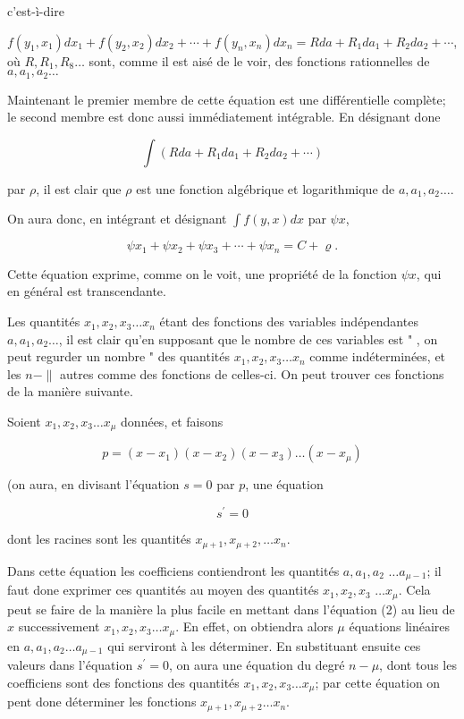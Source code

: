 \documentclass{article}
\begin{document}
c'est-ì-dire

\(f\left(y_{1}, x_{1}\right) d x_{1}+f\left(y_{2}, x_{2}\right) d x_{2}+\cdots+f\left(y_{n}, x_{n}\right) d x_{n}=R d a+R_{1} d a_{1}+R_{2} d a_{2}+\cdots\), où \(R, R_{1}, R_{8} \ldots\) sont, comme il est aisé de le voir, des fonctions rationnelles de \(a, a_{1}, a_{2} \ldots\)

Maintenant le premier membre de cette équation est une différentielle complète; le second membre est donc aussi immédiatement intégrable. En désignant done

\[
\int\left(R d a+R_{1} d a_{1}+R_{2} d a_{2}+\cdots\right)
\]

par \(\rho\), il est clair que \(\rho\) est une fonction algébrique et logarithmique de \(a, a_{1}, a_{2} \ldots\).

On aura donc, en intégrant et désignant \(\int f(y, x) d x\) par \(\psi x\),

\[
\psi x_{1}+\psi x_{2}+\psi x_{3}+\cdots+\psi x_{n}=C+\varrho .
\]

Cette équation exprime, comme on le voit, une propriété de la fonction \(\psi x\), qui en général est transcendante.

Les quantités \(x_{1}, x_{2}, x_{3} \ldots x_{n}\) étant des fonctions des variables indépendantes \(a, a_{1}, a_{2} \ldots\), il est clair qu'en supposant que le nombre de ces variables est " , on peut regurder un nombre " des quantités \(x_{1}, x_{2}, x_{3} \ldots x_{n}\) comme indéterminées, et les \(n-\|\) autres comme des fonctions de celles-ci. On peut trouver ces fonctions de la manière suivante.

Soient \(x_{1}, x_{2}, x_{3} \ldots x_{\mu}\) données, et faisons

\[
p=\left(x-x_{1}\right)\left(x-x_{2}\right)\left(x-x_{3}\right) \ldots\left(x-x_{\mu}\right)
\]

(on aura, en divisant l'équation \(s=0\) par \(p\), une équation

\[
s^{\prime}=0
\]

dont les racines sont les quantités \(x_{\mu+1}, x_{\mu+2}, \ldots x_{n}\).

Dans cette équation les coefficiens contiendront les quantités \(a, a_{1}, a_{2}\) \(\ldots a_{\mu-1}\); il faut done exprimer ces quantités au moyen des quantités \(x_{1}, x_{2}, x_{3}\) \(\ldots x_{\mu}\). Cela peut se faire de la manière la plus facile en mettant dans l'équation (2) au lieu de \(x\) successivement \(x_{1}, x_{2}, x_{3} \ldots x_{\mu}\). En effet, on obtiendra alors \(\mu\) équations linéaires en \(a, a_{1}, a_{2} \ldots a_{\mu-1}\) qui serviront à les déterminer. En substituant ensuite ces valeurs dans l'équation \(s^{\prime}=0\), on aura une équation du degré \(n-\mu\), dont tous les coefficiens sont des fonctions des quantités \(x_{1}, x_{2}, x_{3} \ldots x_{\mu}\); par cette équation on pent done déterminer les fonctions \(x_{\mu+1}, x_{\mu+2} \ldots x_{n}\).
\end{document}

